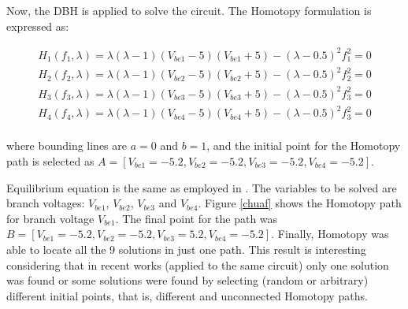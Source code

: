 \documentclass[conference,letterpaper,onecolumn]{IEEEtran}
\begin{document}
Now, the DBH is applied to solve the circuit. The Homotopy formulation is expressed as:

\begin{displaymath}
\begin{array}{c}
H_1(f_1,\lambda)=\lambda(\lambda-1)(V_{be1}-5)(V_{be1}+5)-(\lambda-0.5)^2 f_1^2=0\\
H_2(f_2,\lambda)=\lambda(\lambda-1)(V_{be2}-5)(V_{be2}+5)-(\lambda-0.5)^2 f_2^2=0\\
H_3(f_3,\lambda)=\lambda(\lambda-1)(V_{be3}-5)(V_{be3}+5)-(\lambda-0.5)^2 f_3^2=0\\
H_4(f_4,\lambda)=\lambda(\lambda-1)(V_{be4}-5)(V_{be4}+5)-(\lambda-0.5)^2 f_3^2=0\\
\end{array}
\end{displaymath}

where bounding lines are $a=0$ and $b=1$, and the initial point for the Homotopy path is selected as $A=[V_{be1}=-5.2,V_{be2}=-5.2,V_{be3}=-5.2,V_{be4}=-5.2]$.

Equilibrium equation is the same as employed in \cite{homo_chua}. The variables to be solved are branch voltages: $V_{be1}$, $V_{be2}$, $V_{be3}$ and $V_{be4}$. Figure \ref{chuaf} shows the Homotopy path for branch voltage $V_{be1}$. The final point for the path was $B=[V_{be1}=-5.2,V_{be2}=-5.2,V_{be3}=5.2,V_{be4}=-5.2]$. Finally, Homotopy was able to locate all the 9 solutions in just one path. This result is interesting considering that in recent works \cite{homo_yamamura}\cite{homo_jaewook} (applied to the same circuit) only one solution was found or some solutions were found by selecting (random or arbitrary) different initial points, that is, different and unconnected Homotopy paths.
\end{document}

